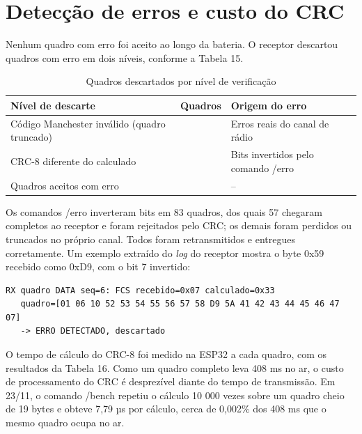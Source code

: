 \documentclass[12pt, oneside, a4paper, sumario=tradicional, chapter=TITLE, brazilian]{abntex2}
\renewcommand{\arraystretch}{1.3}
\begin{document}
\section{Detecção de erros e custo do CRC}

Nenhum quadro com erro foi aceito ao longo da bateria. O receptor descartou quadros com erro em dois níveis, conforme a Tabela 15.

\begin{table}[H]
  \centering
  \caption{Quadros descartados por nível de verificação}
  \small\renewcommand{\arraystretch}{1.3}
  \begin{tabular}{|>{\raggedright\arraybackslash}m{5.86cm}|>{\centering\arraybackslash}m{2.01cm}|>{\centering\arraybackslash}m{6.78cm}|}
  \hline
  \rowcolor{gray!22}\textbf{Nível de descarte} & \textbf{Quadros} & \textbf{Origem do erro} \\ \hline
  Código Manchester inválido (quadro truncado) & 186 & Erros reais do canal de rádio \\ \hline
  CRC-8 diferente do calculado & 57 & Bits invertidos pelo comando /erro \\ \hline
  Quadros aceitos com erro & 0 & – \\ \hline
  \end{tabular}
\end{table}

Os comandos /erro inverteram bits em 83 quadros, dos quais 57 chegaram completos ao receptor e foram rejeitados pelo CRC; os demais foram perdidos ou truncados no próprio canal. Todos foram retransmitidos e entregues corretamente. Um exemplo extraído do \textit{log} do receptor mostra o byte 0x59 recebido como 0xD9, com o bit 7 invertido:

\begin{Verbatim}[fontsize=\scriptsize,frame=single,framesep=2mm,rulecolor=\color{gray!60},breaklines,breakanywhere]
RX quadro DATA seq=6: FCS recebido=0x07 calculado=0x33
   quadro=[01 06 10 52 53 54 55 56 57 58 D9 5A 41 42 43 44 45 46 47 07]
   -> ERRO DETECTADO, descartado
\end{Verbatim}

O tempo de cálculo do CRC-8 foi medido na ESP32 a cada quadro, com os resultados da Tabela 16. Como um quadro completo leva 408 ms no ar, o custo de processamento do CRC é desprezível diante do tempo de transmissão. Em 23/11, o comando /bench repetiu o cálculo 10 000 vezes sobre um quadro cheio de 19 bytes e obteve 7,79 µs por cálculo, cerca de 0,002\% dos 408 ms que o mesmo quadro ocupa no ar.
\end{document}
